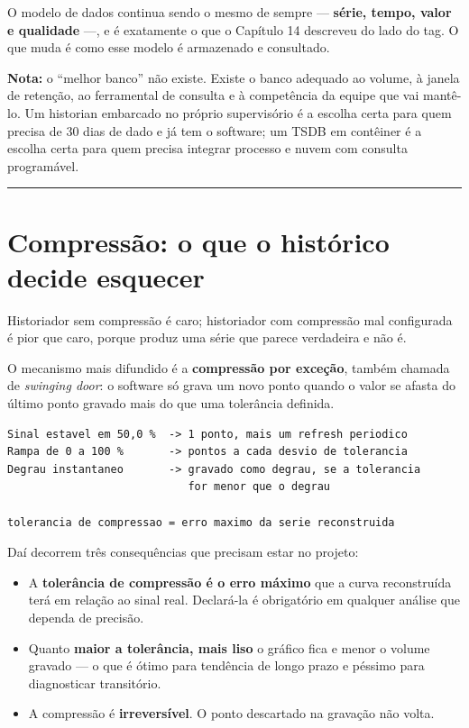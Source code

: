 O modelo de dados continua sendo o mesmo de sempre --- \textbf{série, tempo, valor e qualidade} ---, e é
exatamente o que o Capítulo 14 descreveu do lado do tag. O que muda é como esse modelo é armazenado
e consultado.

\begin{caixanota}

\textbf{Nota:} o ``melhor banco'' não existe. Existe o banco adequado ao volume, à janela de retenção,
ao ferramental de consulta e à competência da equipe que vai mantê-lo. Um historian embarcado no
próprio supervisório é a escolha certa para quem precisa de 30 dias de dado e já tem o software; um
TSDB em contêiner é a escolha certa para quem precisa integrar processo e nuvem com consulta
programável.

\end{caixanota}

\begin{center}\rule{0.5\linewidth}{0.5pt}\end{center}

\section{Compressão: o que o histórico decide esquecer}\label{compressuxe3o-o-que-o-histuxf3rico-decide-esquecer}

Historiador sem compressão é caro; historiador com compressão mal configurada é pior que caro,
porque produz uma série que parece verdadeira e não é.

O mecanismo mais difundido é a \textbf{compressão por exceção}, também chamada de \emph{swinging door}: o
software só grava um novo ponto quando o valor se afasta do último ponto gravado mais do que uma
tolerância definida.

\begin{lstlisting}
Sinal estavel em 50,0 %  -> 1 ponto, mais um refresh periodico
Rampa de 0 a 100 %       -> pontos a cada desvio de tolerancia
Degrau instantaneo       -> gravado como degrau, se a tolerancia
                            for menor que o degrau

tolerancia de compressao = erro maximo da serie reconstruida
\end{lstlisting}

Daí decorrem três consequências que precisam estar no projeto:

\begin{itemize}
\tightlist
\item
  A \textbf{tolerância de compressão é o erro máximo} que a curva reconstruída terá em relação ao sinal
  real. Declará-la é obrigatório em qualquer análise que dependa de precisão.
\item
  Quanto \textbf{maior a tolerância, mais liso} o gráfico fica e menor o volume gravado --- o que é ótimo
  para tendência de longo prazo e péssimo para diagnosticar transitório.
\item
  A compressão é \textbf{irreversível}. O ponto descartado na gravação não volta.
\end{itemize}

